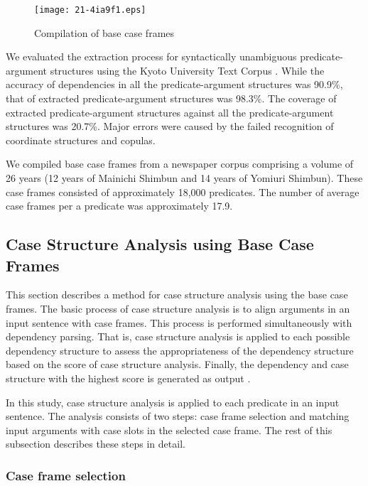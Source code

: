 \documentclass[english]{jnlp_1.4_rep}
\begin{document}
\begin{figure}[b]
  \begin{center}
  \texttt{[image: 21-4ia9f1.eps]}
 \end{center}
  \caption{Compilation of base case frames}
  \label{図::1次格フレーム構築}
\end{figure}

We evaluated the extraction process for syntactically unambiguous
predicate-argument 
\linebreak
structures using the Kyoto University Text Corpus
\cite{Kurohashi1998}. While the accuracy of dependencies in all the
predicate-argument structures was 90.9\%, that of extracted
predicate-argument structures was 98.3\%. The coverage of extracted
predicate-argument 
\linebreak
structures against all the predicate-argument
structures was 20.7\%. Major errors were caused by the failed recognition of
coordinate structures and copulas.

We compiled base case frames from a newspaper corpus comprising a volume
of 26 years (12 years of Mainichi Shimbun and 14 years of Yomiuri Shimbun).
These case frames consisted of approximately 18,000 predicates. The
number of average case frames per a predicate was approximately 17.9.


\subsection{Case Structure Analysis using Base Case Frames}
\label{章::格解析}

This section describes a method for case structure analysis using the
base case frames. The basic process of case structure analysis is to
align arguments in an input sentence with case frames. This process is
performed simultaneously with dependency parsing. That is, case
structure analysis is applied to each possible dependency structure to
assess the appropriateness of the dependency structure based on the
score of case structure analysis. Finally, the dependency and case
structure with the highest score is generated as output \cite{Kuro-IEICE1994}.

In this study, case structure analysis is applied to each predicate in an input
sentence. The analysis consists of two steps: case frame selection and matching
input arguments with case slots in the selected case frame. The
rest of this subsection describes these steps in detail.


\subsubsection*{Case frame selection}
\end{document}
